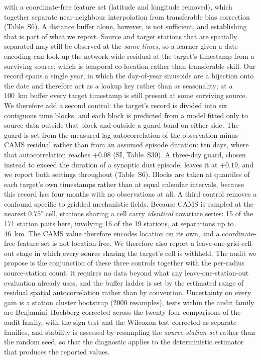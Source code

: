 \documentclass[review,times,authoryear]{elsarticle}
\begin{document}
with a coordinate-free feature set (latitude and longitude removed), which together separate near-neighbour interpolation from transferable bias correction (Table~S6). A distance buffer alone, however, is not sufficient, and establishing that is part of what we report. Source and target stations that are spatially separated may still be observed at the \emph{same times}, so a learner given a date encoding can look up the network-wide residual at the target's timestamp from a surviving source, which is temporal co-location rather than transferable skill. Our record spans a single year, in which the day-of-year sinusoids are a bijection onto the date and therefore act as a lookup key rather than as seasonality; at a 100~km buffer every target timestamp is still present at some surviving source. We therefore add a second control: the target's record is divided into six contiguous time blocks, and each block is predicted from a model fitted only to source data outside that block and outside a guard band on either side. The guard is set from the measured lag autocorrelation of the observation-minus-CAMS residual rather than from an assumed episode duration: ten days, where that autocorrelation reaches $+0.08$ (SI, Table~S30). A three-day guard, chosen instead to exceed the duration of a synoptic dust episode, leaves it at $+0.19$, and we report both settings throughout (Table~S6). Blocks are taken at quantiles of each target's own timestamps rather than at equal calendar intervals, because this record has four months with no observations at all. A third control removes a confound specific to gridded mechanistic fields. Because CAMS is sampled at the nearest $0.75^\circ$ cell, stations sharing a cell carry \emph{identical} covariate series: 15 of the 171 station pairs here, involving 16 of the 19 stations, at separations up to 46~km. The CAMS value therefore encodes location on its own, and a coordinate-free feature set is not location-free. We therefore also report a leave-one-grid-cell-out stage in which every source sharing the target's cell is withheld. The audit we propose is the conjunction of these three controls together with the per-radius source-station count; it requires no data beyond what any leave-one-station-out evaluation already uses, and the buffer ladder is set by the estimated range of residual spatial autocorrelation rather than by convention. Uncertainty on every gain is a station cluster bootstrap (2000 resamples), tests within the audit family are Benjamini--Hochberg corrected across the twenty-four comparisons of the audit family, with the sign test and the Wilcoxon test corrected as separate families, and stability is assessed by resampling the \emph{source-station set} rather than the random seed, so that the diagnostic applies to the deterministic estimator that produces the reported values.
\end{document}
